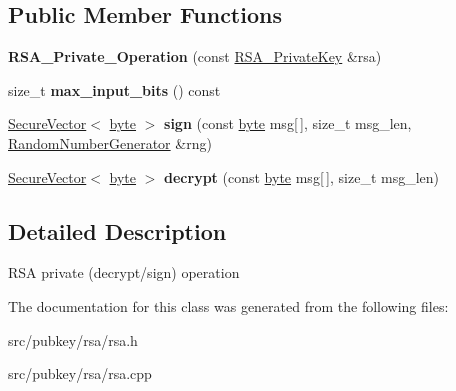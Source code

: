 \subsection*{Public Member Functions}
\begin{DoxyCompactItemize}
\item 
\hypertarget{classBotan_1_1RSA__Private__Operation_a8c6ca766c1a0c782aff3a9c6c5610300}{{\bfseries R\-S\-A\-\_\-\-Private\-\_\-\-Operation} (const \hyperlink{classBotan_1_1RSA__PrivateKey}{R\-S\-A\-\_\-\-Private\-Key} \&rsa)}\label{classBotan_1_1RSA__Private__Operation_a8c6ca766c1a0c782aff3a9c6c5610300}

\item 
\hypertarget{classBotan_1_1RSA__Private__Operation_a9470425b28241380fcccbdd50b0875b7}{size\-\_\-t {\bfseries max\-\_\-input\-\_\-bits} () const }\label{classBotan_1_1RSA__Private__Operation_a9470425b28241380fcccbdd50b0875b7}

\item 
\hypertarget{classBotan_1_1RSA__Private__Operation_ade999efa34616760bbd55aa3eb0fc2ab}{\hyperlink{classBotan_1_1SecureVector}{Secure\-Vector}$<$ \hyperlink{namespaceBotan_a7d793989d801281df48c6b19616b8b84}{byte} $>$ {\bfseries sign} (const \hyperlink{namespaceBotan_a7d793989d801281df48c6b19616b8b84}{byte} msg\mbox{[}$\,$\mbox{]}, size\-\_\-t msg\-\_\-len, \hyperlink{classBotan_1_1RandomNumberGenerator}{Random\-Number\-Generator} \&rng)}\label{classBotan_1_1RSA__Private__Operation_ade999efa34616760bbd55aa3eb0fc2ab}

\item 
\hypertarget{classBotan_1_1RSA__Private__Operation_a6626ea5692fe66e72467423425d106cd}{\hyperlink{classBotan_1_1SecureVector}{Secure\-Vector}$<$ \hyperlink{namespaceBotan_a7d793989d801281df48c6b19616b8b84}{byte} $>$ {\bfseries decrypt} (const \hyperlink{namespaceBotan_a7d793989d801281df48c6b19616b8b84}{byte} msg\mbox{[}$\,$\mbox{]}, size\-\_\-t msg\-\_\-len)}\label{classBotan_1_1RSA__Private__Operation_a6626ea5692fe66e72467423425d106cd}

\end{DoxyCompactItemize}


\subsection{Detailed Description}
R\-S\-A private (decrypt/sign) operation 

The documentation for this class was generated from the following files\-:\begin{DoxyCompactItemize}
\item 
src/pubkey/rsa/rsa.\-h\item 
src/pubkey/rsa/rsa.\-cpp\end{DoxyCompactItemize}
